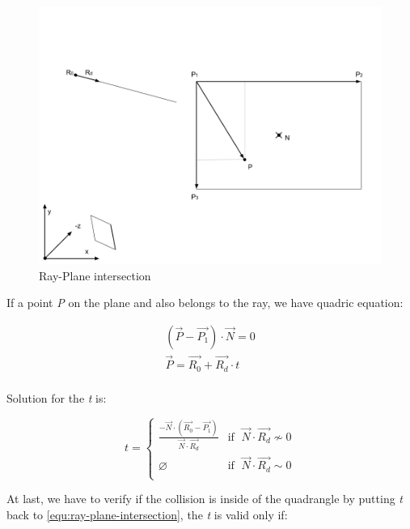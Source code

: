\begin{figure}[H]
\caption[ray-plane-intersection]{Ray-Plane intersection}
\label{fig:ray-plane}
\centering
\includegraphics[width=\linewidth]{Figures/ray-plane-intersection.png}
\decoRule
\end{figure}

If a point \emph{P} on the plane and also belongs to the ray, we have quadric equation:

\begin{equation}
\label{equ:ray-plane-intersection}
\begin{array}{lr}
(\overrightarrow{P} - \overrightarrow{P_1}) \cdot \overrightarrow{N} = 0\\
\overrightarrow{P} = \overrightarrow{R_0} + \overrightarrow{R_d} \cdot t\\
\end{array}
\end{equation}

Solution for the \emph{t} is:

\[
t =
\begin{cases}
\frac{-\overrightarrow{N} \cdot (\overrightarrow{R_0} - \overrightarrow{P_1})}{\overrightarrow{N} \cdot \overrightarrow{R_d}} & \text{if }\;\overrightarrow{N} \cdot \overrightarrow{R_d} \nsim 0\\
\varnothing & \text{if }\;\overrightarrow{N} \cdot \overrightarrow{R_d} \sim 0\\
\end{cases}
\]

At last, we have to verify if the collision is inside of the quadrangle by putting \emph{t} back to \ref{equ:ray-plane-intersection}, \parencite{stackoverflow.ray-plane.2014} the \emph{t} is valid only if:

